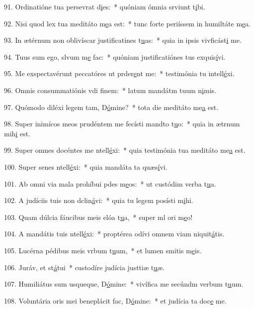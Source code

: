 91. Ordinatióne tua persevrat d\uline{i}es:~* quóniam ómnia srviunt t\uline{i}bi.\par 
92. Nisi quod lex tua meditáto m\uline{e}a est:~* tunc forte periíssem in humiltáte m\uline{e}a.\par 
93. In ætérnum non oblivíscar justificatines t\uline{u}as:~* quia in ipsis vivficást\uline{i} me.\par 
94. Tuus sum ego, slvum m\uline{e} fac:~* quóniam justificatiónes tus exquis\uline{í}vi.\par 
95. Me exspectavérunt peccatóres ut prder\uline{e}nt me:~* testimónia tu intell\uline{é}xi.\par 
96. Omnis consummatiónis vdi f\uline{i}nem:~* latum mandátm tuum n\uline{i}mis.\par 
97. Quómodo diléxi legem tam, D\uline{ó}mine?~* tota die meditáto me\uline{a} est.\par 
98. Super inimícos meos prudéntem me fecísti mandto t\uline{u}o:~* quia in ætrnum mih\uline{i} est.\par 
99. Super omnes docéntes me ntell\uline{é}xi:~* quia testimónia tua meditáto me\uline{a} est.\par 
100. Super senes ntell\uline{é}xi:~* quia mandáta ta quæs\uline{í}vi.\par 
101. Ab omni via mala prohíbui pdes m\uline{e}os:~* ut custódim verba t\uline{u}a.\par 
102. A judíciis tuis non dclin\uline{á}vi:~* quia tu legem posísti m\uline{i}hi.\par 
103. Quam dúlcia fáucibus meis elóa t\uline{u}a,~* super ml ori m\uline{e}o!\par 
104. A mandátis tuis ntell\uline{é}xi:~* proptérea odívi omnem viam niquit\uline{á}tis.\par 
105. Lucérna pédibus meis vrbum t\uline{u}um,~* et lumen smitis m\uline{e}is.\par 
106. Juráv, et st\uline{á}tui~* custodíre judícia justtiæ t\uline{u}æ.\par 
107. Humiliátus sum usqueque, D\uline{ó}mine:~* vivífica me secúndm verbum t\uline{u}um.\par 
108. Voluntária oris mei beneplácit fac, D\uline{ó}mine:~* et judícia ta doc\uline{e} me.\par 
